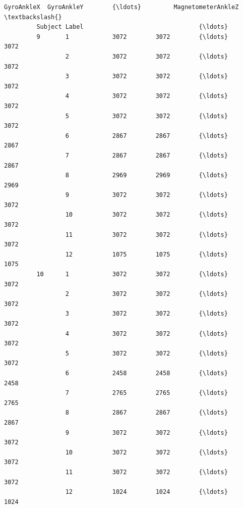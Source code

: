 \documentclass[11pt]{article}
\begin{document}
\begin{Verbatim}[commandchars=\\\{\}]
                        GyroAnkleX  GyroAnkleY        {\ldots}         MagnetometerAnkleZ  \textbackslash{}
         Subject Label                                {\ldots}                              
         9       1            3072        3072        {\ldots}                       3072   
                 2            3072        3072        {\ldots}                       3072   
                 3            3072        3072        {\ldots}                       3072   
                 4            3072        3072        {\ldots}                       3072   
                 5            3072        3072        {\ldots}                       3072   
                 6            2867        2867        {\ldots}                       2867   
                 7            2867        2867        {\ldots}                       2867   
                 8            2969        2969        {\ldots}                       2969   
                 9            3072        3072        {\ldots}                       3072   
                 10           3072        3072        {\ldots}                       3072   
                 11           3072        3072        {\ldots}                       3072   
                 12           1075        1075        {\ldots}                       1075   
         10      1            3072        3072        {\ldots}                       3072   
                 2            3072        3072        {\ldots}                       3072   
                 3            3072        3072        {\ldots}                       3072   
                 4            3072        3072        {\ldots}                       3072   
                 5            3072        3072        {\ldots}                       3072   
                 6            2458        2458        {\ldots}                       2458   
                 7            2765        2765        {\ldots}                       2765   
                 8            2867        2867        {\ldots}                       2867   
                 9            3072        3072        {\ldots}                       3072   
                 10           3072        3072        {\ldots}                       3072   
                 11           3072        3072        {\ldots}                       3072   
                 12           1024        1024        {\ldots}                       1024   
         

\end{Verbatim}
\end{document}
